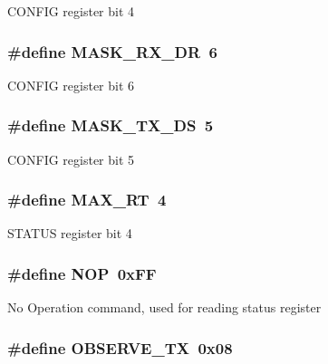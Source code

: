 \label{group__nordic__hal__nrf__reg_ga13e9f541027a36c23211d6c8f3b33a92}
CONFIG register bit 4 \hypertarget{group__nordic__hal__nrf__reg_ga5f30d66a7a448dc83fd695dbd3efbe31}{
\subsubsection[{MASK\_\-RX\_\-DR}]{\setlength{\rightskip}{0pt plus 5cm}\#define MASK\_\-RX\_\-DR~6}}
\label{group__nordic__hal__nrf__reg_ga5f30d66a7a448dc83fd695dbd3efbe31}
CONFIG register bit 6 \hypertarget{group__nordic__hal__nrf__reg_gad5f819a0030605463504bd2599579b4c}{
\subsubsection[{MASK\_\-TX\_\-DS}]{\setlength{\rightskip}{0pt plus 5cm}\#define MASK\_\-TX\_\-DS~5}}
\label{group__nordic__hal__nrf__reg_gad5f819a0030605463504bd2599579b4c}
CONFIG register bit 5 \hypertarget{group__nordic__hal__nrf__reg_gab4482ead4f3b452a032f63ac03ee1870}{
\subsubsection[{MAX\_\-RT}]{\setlength{\rightskip}{0pt plus 5cm}\#define MAX\_\-RT~4}}
\label{group__nordic__hal__nrf__reg_gab4482ead4f3b452a032f63ac03ee1870}
STATUS register bit 4 \hypertarget{group__nordic__hal__nrf__reg_ga700f88377bf36711b711f69b06c52f5d}{
\subsubsection[{NOP}]{\setlength{\rightskip}{0pt plus 5cm}\#define NOP~0xFF}}
\label{group__nordic__hal__nrf__reg_ga700f88377bf36711b711f69b06c52f5d}
No Operation command, used for reading status register \hypertarget{group__nordic__hal__nrf__reg_ga491468eaa7f2db84c152709b0b5fb1aa}{
\subsubsection[{OBSERVE\_\-TX}]{\setlength{\rightskip}{0pt plus 5cm}\#define OBSERVE\_\-TX~0x08}}
